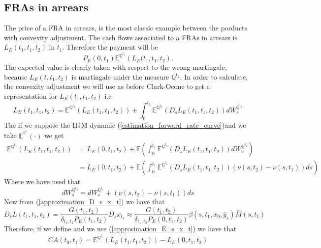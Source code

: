 \documentclass[a4paper,10pt]{article}
\newcommand{\1}{\mathbf{1}}
\begin{document}
\subsection{FRAs in arrears}
The price of a FRA in arrears, is the most classic example between the porducts with convexity adjustment. The cash flows associated to a FRAs in arrears is $L_{E}(t_1,t_1,t_2)$ in $t_1$. Therefore the payment will be
\begin{equation}
P_{E}(0,t_1)\mathbb{E}^{\mathbb{Q}^{t_1}}\left( L_{E}(t_1,t_1,t_2\right).
\end{equation}
The expected value is clearly taken with respect to the wrong martingale, because $L_{E}(t,t_1,t_2)$ is martingale under the measure $\mathbb{Q}^{t_2}$. In order to calculate, the convexity adjustment we will use as before Clark-Ocone to get a representation for $L_{E}(t_1,t_1,t_2)$ i.e
\begin{equation}\label{general_convexity_fras}
L_{E}(t_1,t_1,t_2) = \mathbb{E}^{\mathbb{Q}^{t_2}}\left(L_{E}(t_1,t_1,t_2) \right) + \int_{0}^{t_1} \mathbb{E}^{\mathbb{Q}^{t_2}}\left(D_s L_{E}(t_1,t_1,t_2) \right) dW^{\mathbb{Q}^{t_2}}_{s}
\end{equation}
The if we suppose the HJM dynamic (\ref{estimation_forward_rate_curve})and we take $\mathbb{E}^{^{\mathbb{Q}^{t_1}}}(\cdot)$ we get
\begin{align*}
\mathbb{E}^{\mathbb{Q}^{t_1}}\left(L_{E}(t_1,t_1,t_2) \right) &= L_{E}(0,t_1,t_2) + \mathbb{E}\left( \int_{0}^{t_1} \mathbb{E}^{\mathbb{Q}^{t_2}}\left(D_s L_{E}(t_1,t_1,t_2) \right) dW^{\mathbb{Q}^{t_2}}_{s}\right)\\
&= L_{E}(0,t_1,t_2) + \mathbb{E}\left( \int_{0}^{t_1} \mathbb{E}^{\mathbb{Q}^{t_2}}\left(D_s L_{E}(t_1,t_1,t_2) \right) (\nu(s,t_2)-\nu(s,t_1)) ds \right)
\end{align*}
Where we have used that 
\begin{equation*}
dW^{\mathbb{Q}^{t_2}}_s = dW^{\mathbb{Q}^{t_1}}_s + (\nu(s,t_2) - \nu(s,t_1)) ds 
\end{equation*}
Now from (\ref{approximation_D_s_x_t}) we have that 
\begin{equation*}
D_s L(t_1,t_1,t_2) = \frac{G(t_1,t_2)}{\delta_{t_1,t_2}P_{E}(t_1,t_2)} D_s x_{t_1} \approx \frac{G(t_1,t_2)}{\delta_{t_1,t_2}P_{E}(0,t_1,t_2)} \beta(s,t_1, x_0, \bar{y}_s)\bar{M}(s,t_1)
\end{equation*}
Therefore, if we define and we use (\ref{approsimation_E_s_x_t}) we have that
\begin{equation*}
CA(t_0,t_1) = \mathbb{E}^{\mathbb{Q}^{t_1}}\left( L_{E}\left(t_1,t_1,t_2\right)\right) - L_{E}\left(0,t_1,t_2\right)
\end{equation*}
\end{document}
